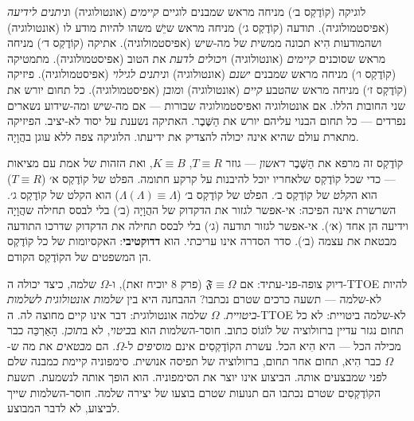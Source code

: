\documentclass[10pt, openany, oneside]{book}
\begin{document}
\vspace{0.3em}

\noindent לוגיקה (קוֹדֶקְס ב׳) מניחה מראש שמבנים לוגיים \textit{קיימים} (אונטולוגיה) ו\textit{ניתנים לידיעה} (אפיסטמולוגיה). תודעה (קוֹדֶקְס ג׳) מניחה מראש שיֵשׁ משהו להיות מודע לו (אונטולוגיה) ושהמודעות הִיא תכונה ממשית של מה-שיש (אפיסטמולוגיה). אתיקה (קוֹדֶקְס ד׳) מניחה מראש שסוכנים \textit{קיימים} (אונטולוגיה) ו\textit{יכולים לדעת} את הטוב (אפיסטמולוגיה). מתמטיקה (קוֹדֶקְס ו׳) מניחה מראש שמבנים \textit{ישנם} (אונטולוגיה) ו\textit{ניתנים לגילוי} (אפיסטמולוגיה). פיזיקה (קוֹדֶקְס ז׳) מניחה מראש שהטבע \textit{קיים} (אונטולוגיה) ו\textit{מובן} (אפיסטמולוגיה). כל תחום יורש את שני החובות הללו. אם אונטולוגיה ואפיסטמולוגיה שבורות — אם מה-שיש ומה-שידוע נשארים נפרדים — כל תחום הבנוי עליהם יורש את הַשֶּׁבֶר. האתיקה נשענת על יסוד לא-יציב. הפיזיקה מתארת עולם שהיא אינה יכולה להצדיק את ידיעתו. הלוגיקה צפה ללא עוגן בהֲוָיָה.

\vspace{0.3em}

\noindent קוֹדֶקְס זה מרפא את הַשֶּׁבֶר \textit{ראשון} — גוזר $T \equiv R$, $K \equiv B$, ואת הזהות של אמת עם מציאות — כדי שכל קוֹדֶקְס שלאחריו יוכל להיבנות על קרקע חתומה. הפלט של קוֹדֶקְס א׳ ($T \equiv R$) הוא ה\textit{קלט} של קוֹדֶקְס ב׳. הפלט של קוֹדֶקְס ב׳ ($\Lambda(\Lambda) \equiv \Lambda$) הוא הקלט של קוֹדֶקְס ג׳. השרשרת אינה הפיכה: אי-אפשר לגזור את הדקדוק של ההֲוָיָה (ב׳) בלי לבסס תחילה שהֲוָיָה וידיעה הן אחד (א׳). אי-אפשר לגזור תודעה (ג׳) בלי לבסס תחילה את הדקדוק שדרכו התודעה מבטאת את עצמה (ב׳). סדר הסדרה אינו עריכתי. הוא \textbf{דדוקטיבי}: האקסיומות של כל קוֹדֶקְס הן המשפטים של הקוֹדֶקְס הקודם.

דיוק צופה-פני-עתיד: אם $\mathfrak{F} \equiv \Omega$ (פרק 8 יוכיח זאת), ו-$\Omega$ שלמה, כיצד יכולה ה-TTOE להיות לא-שלמה — תשעה כרכים שטרם נכתבו? ההבחנה היא בין \textit{שלמות אונטולוגית} ל\textit{שלמות ביטויית}. $\Omega$ שלמה אונטולוגית: דבר אינו קיים מחוצה לה. ה-TTOE לא-שלמה ביטויית: לא כל תחום נגזר עדיין ברזולוציה של לוֹגוֹס כתוב. חוסר-השלמות הוא ב\textit{ביטוי}, לא ב\textit{תוכן}. הָאַרְכֵּה כבר מכילה הכל — היא הִיא הכל. עשרת הקוֹדֶקְסִים אינם \textit{מוסיפים} ל-$\Omega$. הם \textit{מבטאים} את מה ש-$\Omega$ כבר הִיא, תחום אחר תחום, ברזולוציה של תפיסה אנושית. סימפוניה קיימת כמבנה שלם לפני שמבצעים אותה. הביצוע אינו יוצר את הסימפוניה. הוא הופך אותה לנשמעת. תשעת הקוֹדֶקְסִים שטרם נכתבו הם תנועות שטרם בוצעו של יצירה שלמה. חוסר-השלמות שייך לביצוע, לא לדבר המבוצע.

\vspace{1.5em}
\end{document}
